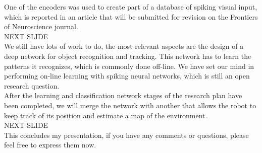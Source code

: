 \documentclass[12t,a4paper]{memoir}
\begin{document}
One of the encoders was used to create part of a database of spiking visual input, which is reported in an article that will be submitted for revision on the Frontiers of Neuroscience journal.\\


{\Large NEXT SLIDE}\\

We still have lots of work to do, the most relevant aspects are the design of a deep network for object recognition and tracking. This network has to learn the patterns it recognizes, which is commonly done off-line. We have set our mind in performing on-line learning with spiking neural networks, which is still an open research question. \\

After the learning and classification network stages of the research plan have been completed, we will merge the network with another that allows the robot to keep track of its position and estimate a map of the environment.\\

{\Large NEXT SLIDE}\\

This concludes my presentation, if you have any comments or questions, please feel free to express them now.\\
\end{document}
